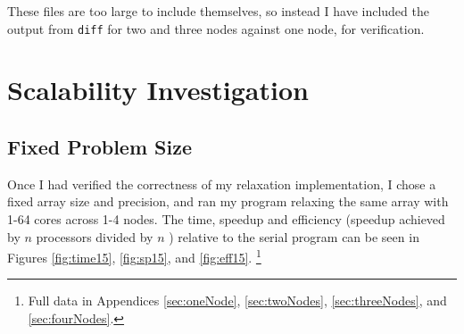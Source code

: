 \documentclass[12pt]{article}
\begin{document}
These files are too large to include themselves, so instead I have included the output from \texttt{diff} for two and three nodes against one node, for verification.

\section{Scalability Investigation}

\subsection{Fixed Problem Size}
Once I had verified the correctness of my relaxation implementation, I chose a fixed array size and precision, and ran my program relaxing the same array with 1-64 cores across 1-4 nodes.  The time, speedup and efficiency (speedup achieved by $n$ processors divided by $n$ \citep{speedup}) relative to the serial program can be seen in Figures \ref{fig:time15}, \ref{fig:sp15}, and \ref{fig:eff15}. \footnote{Full data in Appendices \ref{sec:oneNode}, \ref{sec:twoNodes}, \ref{sec:threeNodes}, and  \ref{sec:fourNodes}.}
\end{document}
